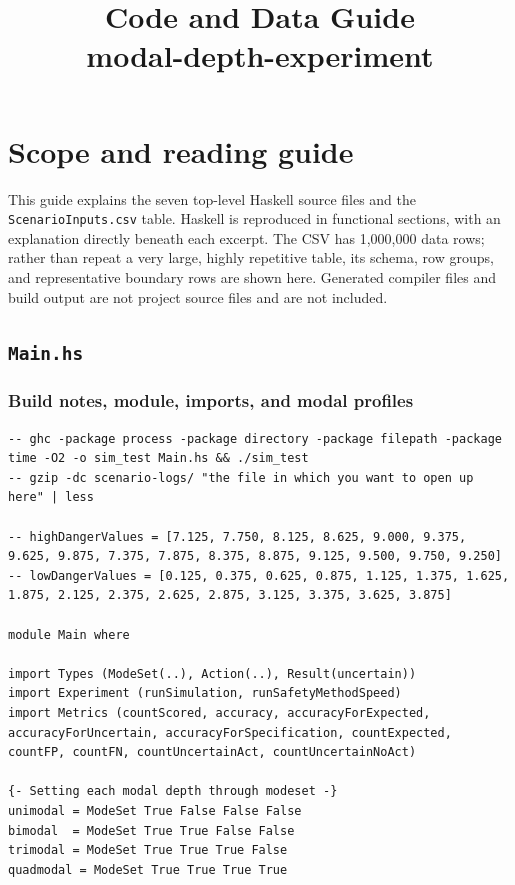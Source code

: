\documentclass[11pt]{article}
\title{Code and Data Guide\\\large modal-depth-experiment}
\author{}
\date{}
\begin{document}
\maketitle

\section*{Scope and reading guide}

This guide explains the seven top-level Haskell source files and the
\texttt{ScenarioInputs.csv} table. Haskell is reproduced in functional
sections, with an explanation directly beneath each excerpt. The CSV has
1,000,000 data rows; rather than repeat a very large, highly repetitive table,
its schema, row groups, and representative boundary rows are shown here.
Generated compiler files and build output are not project source files and are
not included.

\subsection{\texttt{Main.hs}}

\subsubsection{Build notes, module, imports, and modal profiles}

\begin{lstlisting}
-- ghc -package process -package directory -package filepath -package time -O2 -o sim_test Main.hs && ./sim_test
-- gzip -dc scenario-logs/ "the file in which you want to open up here" | less

-- highDangerValues = [7.125, 7.750, 8.125, 8.625, 9.000, 9.375, 9.625, 9.875, 7.375, 7.875, 8.375, 8.875, 9.125, 9.500, 9.750, 9.250]
-- lowDangerValues = [0.125, 0.375, 0.625, 0.875, 1.125, 1.375, 1.625, 1.875, 2.125, 2.375, 2.625, 2.875, 3.125, 3.375, 3.625, 3.875]

module Main where

import Types (ModeSet(..), Action(..), Result(uncertain))
import Experiment (runSimulation, runSafetyMethodSpeed)
import Metrics (countScored, accuracy, accuracyForExpected, accuracyForUncertain, accuracyForSpecification, countExpected, countFP, countFN, countUncertainAct, countUncertainNoAct)

{- Setting each modal depth through modeset -}
unimodal = ModeSet True False False False
bimodal  = ModeSet True True False False
trimodal = ModeSet True True True False
quadmodal = ModeSet True True True True
\end{lstlisting}
\end{document}
